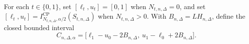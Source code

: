 For each \(t\in\{0,1\}\), set \([\ell_t,u_t]=[0,1]\) when \(N_{t,n,\Delta}=0\), and set \([\ell_t,u_t]=I^{\mathrm{CP}}_{N_{t,n,\Delta},\alpha/2}(S_{t,n,\Delta})\) when \(N_{t,n,\Delta}>0\).  With \(B_{n,\Delta}=LH_{n,\Delta}\), define the closed bounded interval
\[
 C_{n,\Delta,\alpha}
 =\bigl[\ell_1-u_0-2B_{n,\Delta},\ u_1-\ell_0+2B_{n,\Delta}\bigr].
\]